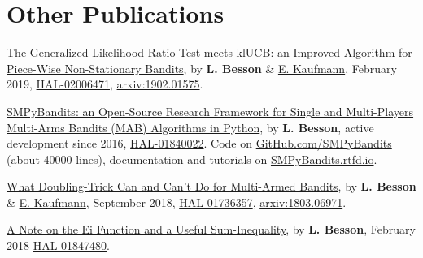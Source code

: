 \section*{Other Publications}
\renewcommand{\labelenumi}{[OP-\arabic{enumi}]}
\begin{etaremune}
\item
  \href{https://hal.inria.fr/hal-02006471/document}{The Generalized Likelihood Ratio Test meets klUCB: an Improved Algorithm for Piece-Wise Non-Stationary Bandits}, by \textbf{L. Besson} \&
  \href{http://chercheurs.lille.inria.fr/ekaufman/research.html}{E.
  Kaufmann}, February 2019,
  \href{https://hal.inria.fr/hal-02006471}{HAL-02006471},
  \href{https://arxiv.org/abs/1902.01575}{arxiv:1902.01575}.
  \cite{Besson2019GLRT}
\item
  \href{https://hal.inria.fr/hal-01840022/document}{SMPyBandits: an
  Open-Source Research Framework for Single and Multi-Players Multi-Arms
  Bandits (MAB) Algorithms in Python}, by \textbf{L. Besson},
  active development since 2016,
  \href{https://hal.inria.fr/hal-01840022}{HAL-01840022}. Code on
  \href{https://GitHub.com/SMPyBandits/SMPyBandits}{GitHub.com/SMPyBandits}
  (about 40000 lines), documentation and tutorials on
  \href{https://SMPyBandits.rtfd.io}{SMPyBandits.rtfd.io}.
  \cite{SMPyBanditsJMLR,SMPyBandits}
\item
  \href{https://hal.inria.fr/hal-01736357/document}{What Doubling-Trick
  Can and Can't Do for Multi-Armed Bandits}, by \textbf{L. Besson} \&
  \href{http://chercheurs.lille.inria.fr/ekaufman/research.html}{E.
  Kaufmann}, September 2018,
  \href{https://hal.inria.fr/hal-01736357}{HAL-01736357},
  \href{https://arxiv.org/abs/1803.06971}{arxiv:1803.06971}.
  \cite{Besson2018DoublingTricks}
\item
  \href{https://hal.inria.fr/hal-01847480/document}{A Note on the Ei
  Function and a Useful Sum-Inequality}, by \textbf{L. Besson}, February
  2018 \href{https://hal.inria.fr/hal-01847480}{HAL-01847480}.
\end{etaremune}


